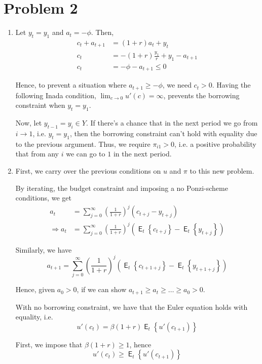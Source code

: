 \documentclass[12pt]{article}
\newcommand{\1}{{\bf 1}} %
\DeclareMathOperator{\E}{\mathsf{E}} %
\newcommand{\cbra}[1]{\left\{ #1 \right\}}
\begin{document}
\section*{Problem 2}
\begin{enumerate}[(1)]
	\item
	
	Let $y_t=y_1$ and $a_t=-\phi$. Then,
	\begin{align*}
		c_t+a_{t+1} & = (1+r)a_t+y_t\\
		c_t& = -(1+r)\frac{y_1}{r}+y_1 - a_{t+1}\\
		c_t& = -\phi - a_{t+1}\leq 0
	\end{align*}
	
	Hence, to prevent a situation where $a_{t+1}\geq -\phi$, we need $c_t>0$. Having the following Inada condition, $\lim_{c\to 0} u'(c)=\infty$, prevents the borrowing constraint when $y_t=y_1$.
	
	Now, let $y_{t-1}=y_i\in Y$. If there's a chance that in the next period we go from $i\to 1$, i.e. $y_t=y_1$, then the borrowing constraint can't hold with equality due to the previous argument. Thus, we require $\pi_{i1}>0$, i.e. a positive probability that from any $i$ we can go to $1$ in the next period.
	\item
	
	First, we carry over the previous conditions on $u$ and $\pi$ to this new problem.
	
	By iterating, the budget constraint and imposing a no Ponzi-scheme conditions, we get
		\begin{align*}
	a_t & = \sum_{j=0}^{\infty}\left( \frac{1}{1+r}\right)^j\left( c_{t+j} -y_{t+j} \right)  \\
	\Rightarrow a_t & = \sum_{j=0}^{\infty}\left( \frac{1}{1+r}\right)^j\left( \E_t\cbra{c_{t+j}} -\E_t\cbra{y_{t+j}} \right) 
	\end{align*}
	
	Similarly, we have
	\[
	a_{t+1}  = \sum_{j=0}^{\infty}\left( \frac{1}{1+r}\right)^j\left( \E_t\cbra{c_{t+1+j}} -\E_t\cbra{y_{t+1+j}} \right) 
	\]
	
	Hence, given $a_0>0$, if we can show $a_{t+1}\geq a_t \geq \dots \geq a_0>0$. 
	
	With no borrowing constraint, we have that the Euler equation holds with equality, i.e.
	\[
	u'(c_t) = \beta (1+r) \E_t\cbra{u'(c_{t+1})}
	\]
	
	First, we impose that $\beta(1+r)\geq 1$, hence
		\[
	u'(c_t) \geq  \E_t\cbra{u'(c_{t+1})}
	\]
	

\end{enumerate}
\end{document}
